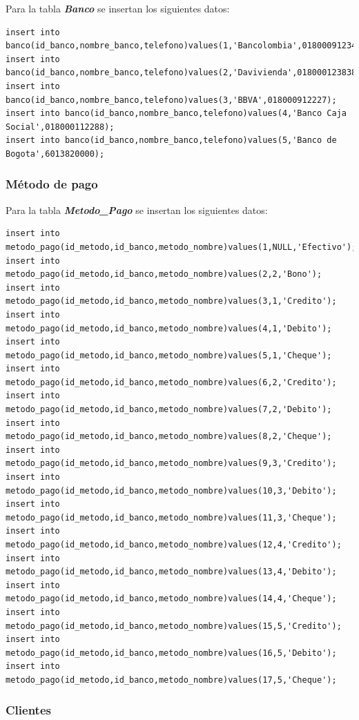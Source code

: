 \documentclass{article}
\begin{document}
Para la tabla \textit{\textbf{Banco}} se insertan los siguientes datos:

\begin{lstlisting}
insert into banco(id_banco,nombre_banco,telefono)values(1,'Bancolombia',018000912345);
insert into banco(id_banco,nombre_banco,telefono)values(2,'Davivienda',018000123838);
insert into banco(id_banco,nombre_banco,telefono)values(3,'BBVA',018000912227);
insert into banco(id_banco,nombre_banco,telefono)values(4,'Banco Caja Social',018000112288);
insert into banco(id_banco,nombre_banco,telefono)values(5,'Banco de Bogota',6013820000);
\end{lstlisting}

\subsubsection{Método de pago}

Para la tabla \textit{\textbf{Metodo\_Pago}} se insertan los siguientes datos:

\begin{lstlisting}
insert into metodo_pago(id_metodo,id_banco,metodo_nombre)values(1,NULL,'Efectivo');
insert into metodo_pago(id_metodo,id_banco,metodo_nombre)values(2,2,'Bono');
insert into metodo_pago(id_metodo,id_banco,metodo_nombre)values(3,1,'Credito');
insert into metodo_pago(id_metodo,id_banco,metodo_nombre)values(4,1,'Debito');
insert into metodo_pago(id_metodo,id_banco,metodo_nombre)values(5,1,'Cheque');
insert into metodo_pago(id_metodo,id_banco,metodo_nombre)values(6,2,'Credito');
insert into metodo_pago(id_metodo,id_banco,metodo_nombre)values(7,2,'Debito');
insert into metodo_pago(id_metodo,id_banco,metodo_nombre)values(8,2,'Cheque');
insert into metodo_pago(id_metodo,id_banco,metodo_nombre)values(9,3,'Credito');
insert into metodo_pago(id_metodo,id_banco,metodo_nombre)values(10,3,'Debito');
insert into metodo_pago(id_metodo,id_banco,metodo_nombre)values(11,3,'Cheque');
insert into metodo_pago(id_metodo,id_banco,metodo_nombre)values(12,4,'Credito');
insert into metodo_pago(id_metodo,id_banco,metodo_nombre)values(13,4,'Debito');
insert into metodo_pago(id_metodo,id_banco,metodo_nombre)values(14,4,'Cheque');
insert into metodo_pago(id_metodo,id_banco,metodo_nombre)values(15,5,'Credito');
insert into metodo_pago(id_metodo,id_banco,metodo_nombre)values(16,5,'Debito');
insert into metodo_pago(id_metodo,id_banco,metodo_nombre)values(17,5,'Cheque');
\end{lstlisting}

\subsubsection{Clientes}
\end{document}
